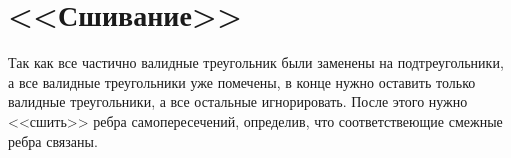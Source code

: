 \section{<<Сшивание>>}

Так как все частично валидные треугольник были заменены на подтреугольники, а все валидные треугольники уже помечены, в конце нужно оставить только валидные треугольники, а все остальные игнорировать. После этого нужно <<сшить>> ребра самопересечений, определив, что соответствеющие смежные ребра связаны.